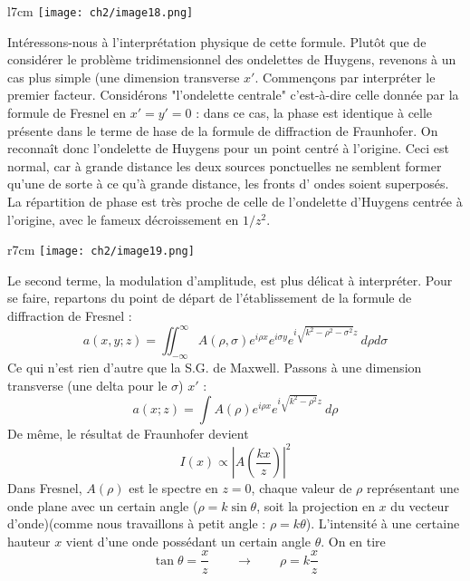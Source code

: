 \begin{wrapfigure}[10]{l}{7cm}
\vspace{-5mm}
\texttt{[image: ch2/image18.png]}
\end{wrapfigure}
Intéressons-nous à l'interprétation physique de cette formule. Plutôt que de considérer le 
problème tridimensionnel des ondelettes de Huygens, revenons à un cas plus simple (une 
dimension transverse $x'$. Commençons par interpréter le premier facteur. Considérons 
"l'ondelette centrale" c'est-à-dire celle donnée par la formule de Fresnel en $x'=y'=0$ : 
dans ce cas, la phase est identique à celle présente dans le terme de hase de la 
formule de diffraction de Fraunhofer. On reconnaît donc l'ondelette de Huygens pour un 
point centré à l'origine. Ceci est normal, car à grande distance les deux sources 
ponctuelles ne semblent former qu'une de sorte à ce qu'à grande distance, les fronts d'
ondes soient superposés. La répartition de phase est très proche de celle de l'ondelette 
d'Huygens centrée à l'origine, avec le fameux décroissement en $1/z^2$.\\


\begin{wrapfigure}[10]{r}{7cm}
\vspace{-3mm}
\texttt{[image: ch2/image19.png]}
\end{wrapfigure}
Le second terme, la modulation d'amplitude, est plus délicat à interpréter. Pour se faire, 
repartons du point de départ de l'établissement de la formule de diffraction de Fresnel :
\begin{equation}
a(x,y;z) = \iint_{-\infty}^\infty A(\rho,\sigma)e^{i\rho x}e^{i\sigma y} e^{i\sqrt{k^2-\rho^2-
\sigma^2}z}\ d\rho d\sigma
\end{equation}
Ce qui n'est rien d'autre que la S.G. de Maxwell. Passons à une dimension transverse (une 
delta pour le $\sigma$) $x'$ :
\begin{equation}
a(x;z) = \int A(\rho)e^{i\rho x} e^{i\sqrt{k^2-\rho^2}z}\ d\rho 
\end{equation}
De même, le résultat de Fraunhofer devient
\begin{equation}
I(x) \propto \left|A\left(\dfrac{kx}{z}\right)\right|^2
\end{equation}
Dans Fresnel, $A(\rho)$ est le spectre en $z=0$, chaque valeur de $\rho$ représentant une 
onde plane avec un certain angle ($\rho = k\sin\theta$, soit la projection en $x$ du 
vecteur d'onde)(comme nous travaillons à petit angle : $\rho = k\theta$). L'intensité à une 
certaine hauteur $x$ vient d'une onde possédant un certain angle $\theta$. On en tire
\begin{equation}
\tan \theta = \dfrac{x}{z}\qquad \rightarrow \qquad \rho = k\frac{x}{z}
\end{equation}

